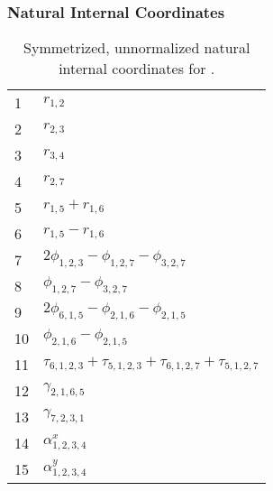 \documentclass[10pt,oneside]{article}
\begin{document}
\clearpage

\subsubsection*{Natural Internal Coordinates}
\begin{table}[h!]
\centering
\caption{Symmetrized, unnormalized natural internal coordinates for .}
\small
\begin{tabular}{ll}
  1   & $r_{1,2}$ \\
  2   & $r_{2,3}$ \\
  3   & $r_{3,4}$ \\
  4   & $r_{2,7}$ \\
  5   & $r_{1,5} + r_{1,6}$ \\
  6   & $r_{1,5} - r_{1,6}$ \\
  7   & $2\phi_{1,2,3} - \phi_{1,2,7} - \phi_{3,2,7}$ \\
  8   & $\phi_{1,2,7} - \phi_{3,2,7}$ \\
  9   & $2\phi_{6,1,5} - \phi_{2,1,6} - \phi_{2,1,5}$ \\
  10  & $\phi_{2,1,6} - \phi_{2,1,5}$ \\
  11  & $\tau_{6,1,2,3} + \tau_{5,1,2,3} + \tau_{6,1,2,7} + \tau_{5,1,2,7}$ \\
  12  & $\gamma_{2,1,6,5}$ \\
  13  & $\gamma_{7,2,3,1}$ \\
  14  & $\alpha^x_{1,2,3,4}$ \\
  15  & $\alpha^y_{1,2,3,4}$ \\
\end{tabular}
\end{table}

\clearpage

\subsection{\ \ \ }
\end{document}
